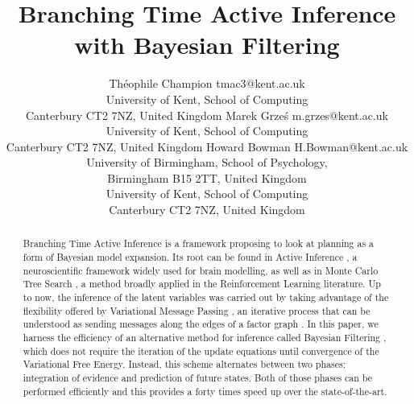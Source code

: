 \documentclass[twoside,11pt]{article}
\begin{document}
\title{Branching Time Active Inference with Bayesian Filtering}

\author{\name Théophile Champion \email tmac3@kent.ac.uk \\
       \addr University of Kent, School of Computing\\
       Canterbury CT2 7NZ, United Kingdom
       \AND
       \name Marek Grze\'s \email m.grzes@kent.ac.uk \\
       \addr University of Kent, School of Computing\\
       Canterbury CT2 7NZ, United Kingdom
       \AND
       \name Howard Bowman \email H.Bowman@kent.ac.uk \\
       \addr University of Birmingham, School of Psychology,\\
       Birmingham B15 2TT, United Kingdom\\
       University of Kent, School of Computing\\
       Canterbury CT2 7NZ, United Kingdom
       }
       

\maketitle

\begin{abstract}%
Branching Time Active Inference \citep{AITS_THEORY,AITS_PRACTICE} is a framework proposing to look at planning as a form of Bayesian model expansion. Its root can be found in Active Inference \citep{FRISTON2016862,AI_TUTO,AI_VMP}, a neuroscientific framework widely used for brain modelling, as well as in Monte Carlo Tree Search \citep{6145622}, a method broadly applied in the Reinforcement Learning literature. Up to now, the inference of the latent variables was carried out by taking advantage of the flexibility offered by Variational Message Passing \citep{VMP_TUTO}, an iterative process that can be understood as sending messages along the edges of a factor graph \citep{FFG_TUTO}. In this paper, we harness the efficiency of an alternative method for inference called Bayesian Filtering \citep{BAYESIAN_FILTERING}, which does not require the iteration of the update equations until convergence of the Variational Free Energy. Instead, this scheme alternates between two phases: integration of evidence and prediction of future states. Both of those phases can be performed efficiently and this provides a forty times speed up over the state-of-the-art.
\end{abstract}
\end{document}
